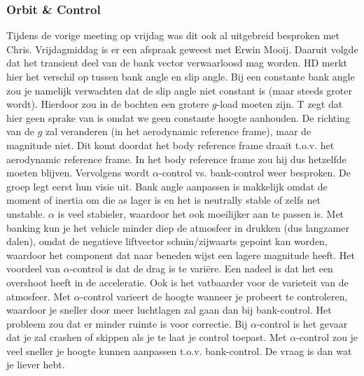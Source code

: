 \subsubsection{Orbit \& Control}
Tijdens de vorige meeting op vrijdag was dit ook al uitgebreid besproken met Chris. Vrijdagmiddag is er een afspraak geweest met Erwin Mooij. Daaruit volgde dat het transient deel van de bank vector verwaarloosd mag worden. HD merkt hier het verschil op tussen bank angle en slip angle. Bij een constante bank angle zou je namelijk verwachten dat de slip angle niet constant is (maar steeds groter wordt). Hierdoor zou in de bochten een grotere $g$-load moeten zijn. T zegt dat hier geen sprake van is omdat we geen constante hoogte aanhouden. De richting van de $g$ zal veranderen (in het aerodynamic reference frame), maar de magnitude niet. Dit komt doordat het body reference frame draait t.o.v. het aerodynamic reference frame. In het body reference frame zou hij dus hetzelfde moeten blijven.
\newline\newline
Vervolgens wordt $\alpha$-control vs. bank-control weer besproken. De groep legt eerst hun visie uit. Bank angle aanpassen is makkelijk omdat de moment of inertia om die as lager is en het is neutrally stable of zelfs net unstable. $\alpha$ is veel stabieler, waardoor het ook moeilijker aan te passen is. Met banking kun je het vehicle minder diep de atmosfeer in drukken (dus langzamer dalen), omdat de negatieve liftvector schuin/zijwaarts gepoint kan worden, waardoor het component dat naar beneden wijst een lagere magnitude heeft. Het voordeel van $\alpha$-control is dat de drag is te vari\"{e}re. Een nadeel is dat het een overshoot heeft in de acceleratie. Ook is het vatbaarder voor de varieteit van de atmosfeer. Met $\alpha$-control varieert de hoogte wanneer je probeert te controleren, waardoor je sneller door meer luchtlagen zal gaan dan bij bank-control. Het probleem zou dat er minder ruimte is voor correctie. Bij $\alpha$-control is het gevaar dat je zal crashen of skippen als je te laat je control toepast. Met $\alpha$-control zou je veel sneller je hoogte kunnen aanpassen t.o.v. bank-control. De vraag is dan wat je liever hebt.
\newline\newline

